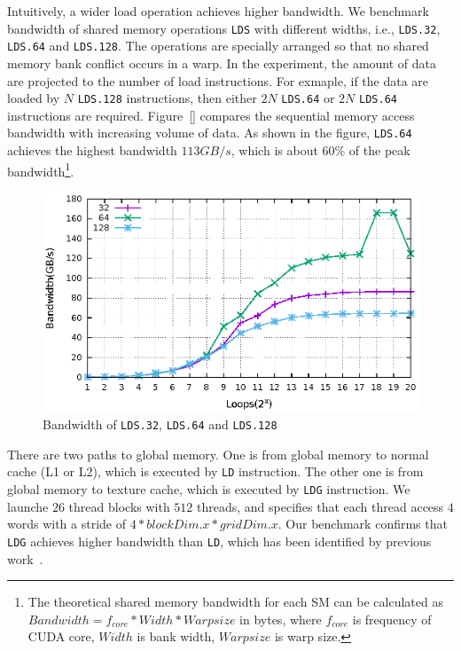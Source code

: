 \documentclass{sig-alternate-05-2015}
\begin{document}
Intuitively, a wider load operation achieves higher bandwidth. We benchmark bandwidth of shared memory operations {\tt LDS} with different widths, i.e., {\tt LDS.32}, {\tt LDS.64}
and {\tt LDS.128}. The operations are specially arranged so that no shared memory bank conflict occurs in a warp. In the experiment, the amount of data are projected to the number of load instructions. For exmaple, if the data are loaded by $N$ {\tt LDS.128} instructions, then either $2N$ {\tt LDS.64} or $2N$ {\tt LDS.64} instructions are required. Figure~\ref{} compares the sequential memory access bandwidth with increasing volume of data. As shown in the figure, {\tt LDS.64} achieves the highest bandwidth $113GB/s$, which is about $60\%$ of the peak bandwidth\footnote{The theoretical shared memory bandwidth for each SM can be calculated as $Bandwidth=f_{core}*Width*Warpsize$ in
bytes, where $f_{core}$ is frequency of CUDA core, $Width$ is bank width, $Warpsize$ is warp size.}.

\begin{figure}[htbp]
\begin{center}
\includegraphics[scale=0.6]{lds_bandwidth}
    \caption{ Bandwidth of {\tt LDS.32}, {\tt LDS.64} and {\tt LDS.128}}
\label{fig:lds_bw}
\end{center}
\end{figure}

There are two paths to global memory. One is from global memory to normal cache (L1 or L2), which is executed by {\tt LD} instruction. The other one is from global memory to texture cache, which is executed by {\tt LDG} instruction. We launche $26$ thread blocks with $512$ threads, and specifies that each thread access $4$ words with a stride of $4*blockDim.x*gridDim.x$. Our benchmark confirms that {\tt LDG} achieves higher bandwidth than {\tt LD}, which has been identified by previous work~\cite{}.
\end{document}
